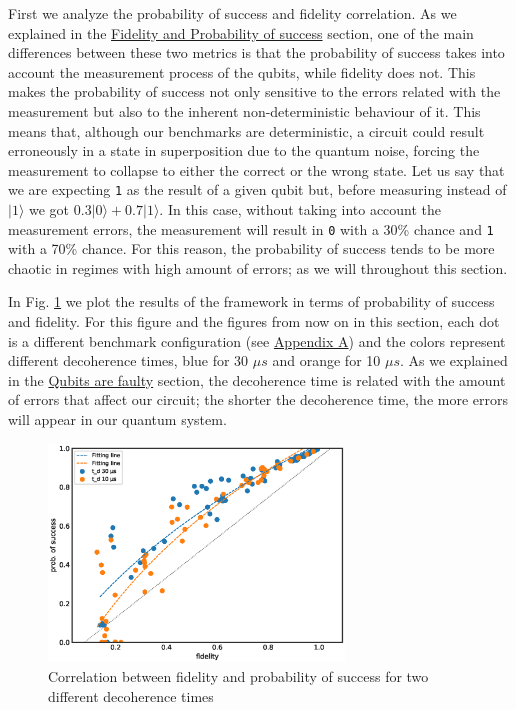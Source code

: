 First we analyze the probability of success and fidelity correlation.
As we explained in the \hyperref[sec:org0c7b2c2]{Fidelity and Probability of success} section, one of the main differences between these two metrics is that the probability of success takes into account the measurement process of the qubits, while fidelity does not.
This makes the probability of success not only sensitive to the errors related with the measurement but also to the inherent non-deterministic behaviour of it.
This means that, although our benchmarks are deterministic, a circuit could result erroneously in a state in superposition due to the quantum noise, forcing the measurement to collapse to either the correct or the wrong state.
Let us say that we are expecting \texttt{1} as the result of a given qubit but, before measuring instead of \(|1\rangle\) we got \(0.3 |0\rangle + 0.7 |1\rangle\).
In this case, without taking into account the measurement errors, the measurement will result in \texttt{0} with a 30\% chance and \texttt{1} with a 70\% chance.
For this reason, the probability of success tends to be more chaotic in regimes with high amount of errors; as we will throughout this section.



In Fig. \ref{fig:f_ps_correlation_with_meas_error} we plot the results of the framework in terms of probability of success and fidelity. 
For this figure and the figures from now on in this section, each dot is a different benchmark configuration (see \href{appendix-1.org}{Appendix A}) and the colors represent different decoherence times, blue for 30 \(\mu s\) and orange for 10 \(\mu s\).
As we explained in the \href{quantum_computing.org}{Qubits are faulty} section, the decoherence time is related with the amount of errors that affect our circuit; the shorter the decoherence time, the more errors will appear in our quantum system.


\begin{figure}[htbp]
\centering
\includegraphics[width=0.7\textwidth]{figures/f_ps_correlation.eps}
\caption{\label{fig:f_ps_correlation_with_meas_error}
Correlation between fidelity and probability of success for two different decoherence times}
\end{figure}



